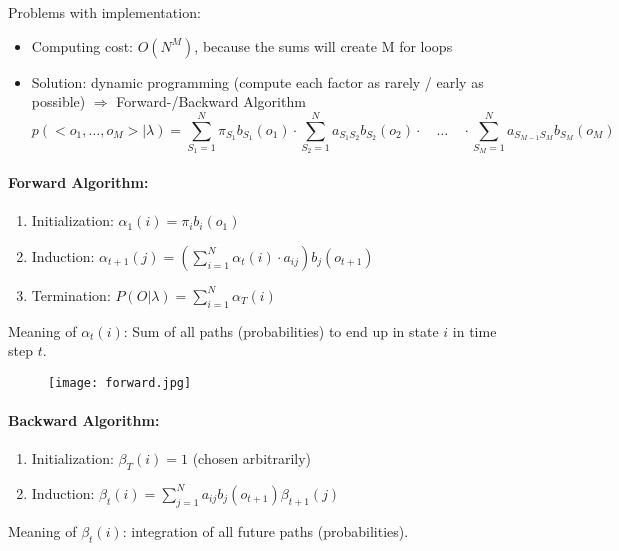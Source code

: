 Problems with implementation:
\begin{itemize}
	\item Computing cost: \(O(N^M)\), because the sums will create M for loops
	\item Solution: dynamic programming (compute each factor as rarely / early as possible) $\Rightarrow$ Forward-/Backward Algorithm
	\[p(<o_1,\dots,o_M>|\lambda) = \sum_{S_1=1}^{N} \pi_{S_1} b_{S_1}(o_1) \cdot \sum_{S_2=1}^{N} a_{S_1 S_2} b_{S_2}(o_2) \cdot \quad \ldots \quad \cdot \sum_{S_M=1}^{N} a_{S_{M - 1} S_{M}} b_{S_M}(o_M)\]
\end{itemize}

\paragraph{Forward Algorithm:}

\begin{enumerate}
    \item Initialization:
        \(\alpha_1(i) = \pi_i b_i(o_1)\)
    \item Induction:
        \(\alpha_{t+1}(j) = (\sum_{i=1}^N \alpha_t(i) \cdot a_{ij}) b_j(o_{t+1})\)
    \item Termination:
        \(P(O|\lambda) = \sum_{i=1}^N \alpha_T(i)\)
\end{enumerate}

Meaning of $\alpha_t(i)$: Sum of all paths (probabilities) to end up in state $i$ in time step $t$.

\begin{figure}[H]
	\centering
	\texttt{[image: forward.jpg]}
\end{figure}

\paragraph{Backward Algorithm:}

\begin{enumerate}
    \item Initialization: \(\beta_T (i) = 1\) (chosen arbitrarily)
    \item Induction: \(\beta_t(i) = \sum_{j=1}^N a_{ij} b_j(o_{t+1}) \beta_{t+1}(j)\)
\end{enumerate}

Meaning of $\beta_t(i)$: integration of all future paths (probabilities).


